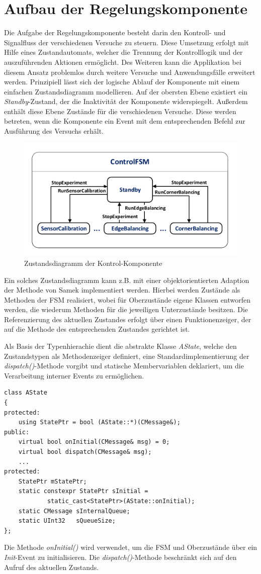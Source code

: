 \section{Aufbau der Regelungskomponente}\label{section_controlcomp}
Die Aufgabe der Regelungskomponente besteht darin den Kontroll- und Signalfluss der verschiedenen Versuche zu steuern. Diese Umsetzung erfolgt mit Hilfe eines Zustandautomats, welcher die Trennung der Kontrolllogik und der auszuführenden Aktionen ermöglicht. Des Weiteren kann die Applikation bei diesem Ansatz problemlos durch weitere Versuche und Anwendungsfälle erweitert werden. 
Prinzipiell lässt sich der logische Ablauf der Komponente mit einem einfachen Zustandsdiagramm modellieren. Auf der obersten Ebene existiert ein \textit{Standby}-Zustand, der die Inaktivität der Komponente widerspiegelt. Außerdem enthält diese Ebene Zustände für die verschiedenen Versuche. Diese werden betreten, wenn die Komponente ein Event mit dem entsprechenden Befehl zur Ausführung des Versuchs erhält.
\begin{figure}[h!]
\centering
\includegraphics[width=0.7\linewidth]{img/SW_2_ControlComp_SC.pdf}
\caption{Zustandsdiagramm der Kontrol-Komponente}
\end{figure}

Ein solches Zustandsdiagramm kann z.B. mit einer objektorientierten Adaption der Methode von Samek \cite[S. 246 ff.]{Wietzke1} implementiert werden. Hierbei werden Zustände als Methoden der FSM realisiert, wobei für Oberzustände eigene Klassen entworfen werden, die wiederum Methoden für die jeweiligen Unterzustände besitzen. Die Referenzierung des aktuellen Zustandes erfolgt über einen Funktionenzeiger, der auf die Methode des entsprechenden Zustandes gerichtet ist. 

Als Basis der Typenhierachie dient die abstrakte Klasse \textit{AState}, welche den Zustandstypen als Methodenzeiger definiert, eine Standardimplementierung der \textit{dispatch()}-Methode vorgibt und statische Membervariablen deklariert, um die Verarbeitung interner Events zu ermöglichen.
\begin{lstlisting}[caption={Abstrakte Basisklasse für die Zustände},captionpos=b]
class AState
{
protected:
	using StatePtr = bool (AState::*)(CMessage&);
public:
	virtual bool onInitial(CMessage& msg) = 0;
	virtual bool dispatch(CMessage& msg);
	...
protected:
	StatePtr mStatePtr;
	static constexpr StatePtr sInitial = 
			static_cast<StatePtr>(AState::onInitial);
	static CMessage sInternalQueue;
	static UInt32   sQueueSize;
};
\end{lstlisting}
Die Methode \textit{onInitial()} wird verwendet, um die FSM und Oberzustände über ein \textit{Init}-Event zu initialisieren. Die \textit{dispatch()}-Methode beschränkt sich auf den Aufruf des aktuellen Zustands.

